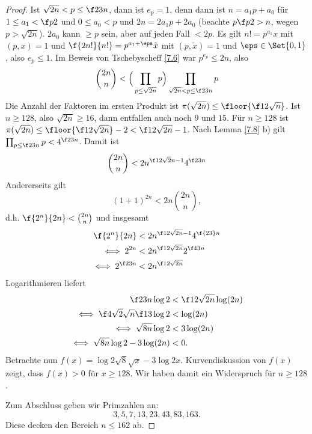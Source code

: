 \begin{st}
\begin{proof}
		Ist $\sqrt{2n} < p \le \f 23 n$, dann ist $e_p = 1$, denn dann ist $n = a_1 p + a_0$ für $1 \le a_1 < \f p2$ und $0 \le a_0 < p$ und $2n = 2a_1 p + 2a_0$ (beachte $p \f p2 > n$, wegen $p > \sqrt{2n}$).
		$2 a_0$ kann $\ge p$ sein, aber auf jeden Fall $< 2p$.
		Es gilt $n! = p^{a_1} x$ mit $(p,x) = 1$ und $\f {2n!}{n!} = p^{a_1 + \eps} \tilde x$ mit $(p, \tilde x) = 1$ und $\eps \in \Set{0, 1}$, also $e_p \le 1$.
		Im Beweis von Tschebyscheff \ref{7.6} war $p^{e_p} \le 2n$, also
		\[
			\binom{2n}{n}
			< \Big(\prod_{p \le \sqrt{2n}} p \Big) \prod_{\sqrt{2n} < p \le \f 23 n} p
		\]
		Die Anzahl der Faktoren im ersten Produkt ist $\pi(\sqrt{2n}) \le \floor{\f 12 \sqrt n}$.
		Ist $n \ge 128$, also $\sqrt{2n} \ge 16$, dann entfallen auch noch $9$ und $15$.
		Für $n \ge 128$ ist $\pi(\sqrt{2n}) \le \floor{\f 12 \sqrt{2n}} - 2 < \f 12 \sqrt{2n} - 1$.
		Nach Lemma \ref{7.8} b) gilt $\prod_{p \le \f 23 n} p < 4^{\f 23 n}$.
		Damit ist
		\[
			\binom{2n}{n} < 2 n^{\f 12 \sqrt 2n - 1} 4^{\f 23 n}
		\]
		Andererseits gilt
		\[
			(1 + 1)^{2n}
			< 2n \binom{2n}{n},
		\]
		d.h. $\f{2^n}{2n} < \binom{2n}{n}$ und insgesamt
		\begin{align*}
			\f{2^n}{2n} &< 2n^{\f 12 \sqrt{2n} - 1} 4^{\f{23}n} \\
			\iff 2^{2n} &< 2n^{\f 12 \sqrt{2n}} 2^{\f 43 n} \\
			\iff 2^{\f 23 n} &< 2n^{\f 12 \sqrt{2n}}
		\end{align*}
		Logarithmieren liefert
		\begin{align*}
			\f 23 n \log 2 &< \f 12 \sqrt{2n} \log(2n) \\
			\iff \f 4{\sqrt 2} \sqrt n \f 13 \log 2 &< \log(2n) \\
			\iff \sqrt{8n} \log 2 &< 3 \log(2n) \\
			\iff \sqrt{8n} \log 2 - 3 \log(2n) &< 0.
		\end{align*}
		Betrachte nun $f(x) = \log 2 \sqrt{8} \sqrt{x} - 3 \log 2x$.
		Kurvendiskussion von $f(x)$ zeigt, dass $f(x) > 0$ für $x \ge 128$.
		Wir haben damit ein Widerspruch für $n \ge 128$.

		Zum Abschluss geben wir Primzahlen an:
		\[
			3, 5, 7, 13, 23, 43, 83, 163.
		\]
		Diese decken den Bereich $n \le 162$ ab.
	\end{proof}
\end{st}


